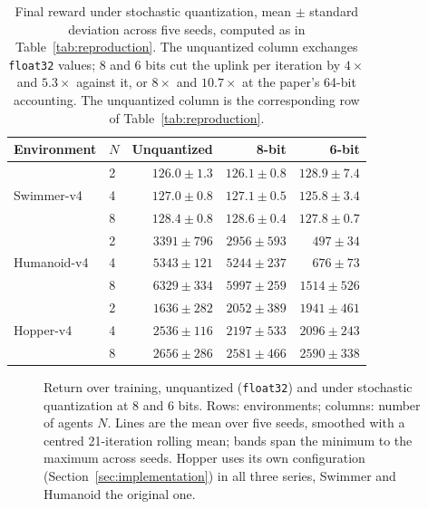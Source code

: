 \begin{table}[t]
  \centering
  \caption{Final reward under stochastic quantization, mean $\pm$ standard
  deviation across five seeds, computed as in Table~\ref{tab:reproduction}.
  The unquantized column exchanges \texttt{float32} values; 8 and 6 bits cut
  the uplink per iteration by $4\times$ and $5.3\times$ against it, or $8\times$
  and $10.7\times$ at the paper's 64-bit accounting. The unquantized column
  is the corresponding row of Table~\ref{tab:reproduction}.}
  \label{tab:quantgrid}
  \begin{tabular}{llrrr}
    \toprule
    Environment & $N$ & Unquantized & 8-bit & 6-bit \\
    \midrule
    \multirow{3}{*}{Swimmer-v4}
      & 2 & $126.0 \pm 1.3$ & $126.1 \pm 0.8$ & $128.9 \pm 7.4$ \\
      & 4 & $127.0 \pm 0.8$ & $127.1 \pm 0.5$ & $125.8 \pm 3.4$ \\
      & 8 & $128.4 \pm 0.8$ & $128.6 \pm 0.4$ & $127.8 \pm 0.7$ \\
    \midrule
    \multirow{3}{*}{Humanoid-v4}
      & 2 & $3391 \pm 796$ & $2956 \pm 593$ & $497 \pm 34$ \\
      & 4 & $5343 \pm 121$ & $5244 \pm 237$ & $676 \pm 73$ \\
      & 8 & $6329 \pm 334$ & $5997 \pm 259$ & $1514 \pm 526$ \\
    \midrule
    \multirow{3}{*}{Hopper-v4}
      & 2 & $1636 \pm 282$ & $2052 \pm 389$ & $1941 \pm 461$ \\
      & 4 & $2536 \pm 116$ & $2197 \pm 533$ & $2096 \pm 243$ \\
      & 8 & $2656 \pm 286$ & $2581 \pm 466$ & $2590 \pm 338$ \\
    \bottomrule
  \end{tabular}
\end{table}

\begin{figure}[tbp]
  \centering
  \par\medskip
  
  \caption{Return over training, unquantized (\texttt{float32}) and under
  stochastic quantization at 8 and 6 bits. Rows: environments; columns: number of agents
  $N$. Lines are the mean over five seeds, smoothed with a centred 21-iteration
  rolling mean; bands span the minimum to the maximum across seeds. Hopper
  uses its own configuration (Section~\ref{sec:implementation}) in all three
  series, Swimmer and Humanoid the original one.}
  \label{fig:quant}
\end{figure}

